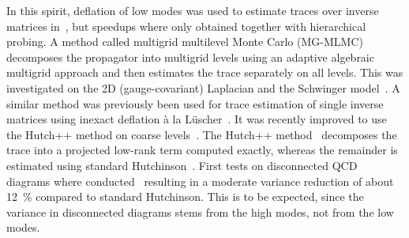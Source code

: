 In this spirit, deflation of low modes was used to estimate traces over inverse matrices in~\cite{Gambhir:2016uwp}, but speedups where only obtained together with hierarchical probing.
A method called multigrid multilevel Monte Carlo (MG-MLMC) decomposes the propagator into multigrid levels using an adaptive algebraic multigrid approach and then estimates the trace separately on all levels.
This was investigated on the 2D (gauge-covariant) Laplacian and the Schwinger model~\cite{doi:10.1137/21M1441894:2022}.
A similar method was previously been used for trace estimation of single inverse matrices using inexact deflation à la Lüscher~\cite{Romero:2019psj}.
It was recently improved to use the Hutch++ method on coarse levels~\cite{Frommer:2022qiy}.
The Hutch++ method~\cite{doi:10.1137/1.9781611976496.16:2021} decomposes the trace into a projected low-rank term computed exactly, whereas the remainder is estimated using standard Hutchinson~\cite{Hutchinson01011990}.
First tests on disconnected QCD diagrams where conducted~\cite{Frommer:2025kfp} resulting in a moderate variance reduction of about \SI{12}{\percent} compared to standard Hutchinson.
This is to be expected, since the variance in disconnected diagrams stems from the high modes, not from the low modes.


